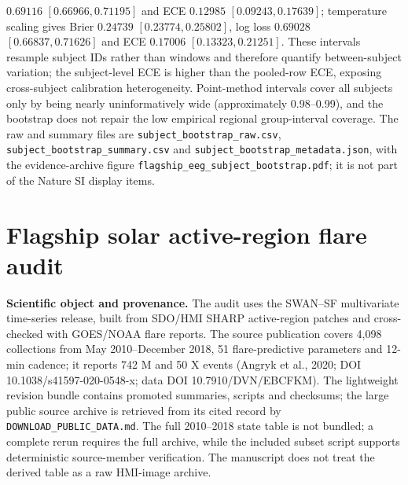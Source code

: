 \documentclass[11pt,a4paper]{article}
\numberwithin{equation}{section}
\theoremstyle{definition}\newtheorem{definition}[theorem]{Definition}
\theoremstyle{remark}\newtheorem{remark}[theorem]{Remark}
\begin{document}
$0.69116$ $[0.66966,0.71195]$ and ECE $0.12985$ $[0.09243,0.17639]$; temperature scaling gives Brier $0.24739$ $[0.23774,0.25802]$, log loss $0.69028$ $[0.66837,0.71626]$ and ECE $0.17006$ $[0.13323,0.21251]$. These intervals resample subject IDs rather than windows and therefore quantify between-subject variation; the subject-level ECE is higher than the pooled-row ECE, exposing cross-subject calibration heterogeneity. Point-method intervals cover all subjects only by being nearly uninformatively wide (approximately 0.98--0.99), and the bootstrap does not repair the low empirical regional group-interval coverage. The raw and summary files are \texttt{subject\_bootstrap\_raw.csv}, \texttt{subject\_bootstrap\_summary.csv} and \texttt{subject\_bootstrap\_metadata.json}, with the evidence-archive figure \texttt{flagship\_eeg\_subject\_bootstrap.pdf}; it is not part of the Nature SI display items.

\section{Flagship solar active-region flare audit}\label{sec:solar}
\textbf{Scientific object and provenance.} The audit uses the SWAN--SF multivariate time-series release, built from SDO/HMI SHARP active-region patches and cross-checked with GOES/NOAA flare reports. The source publication covers 4,098 collections from May 2010--December 2018, 51 flare-predictive parameters and 12-min cadence; it reports 742 M and 50 X events (Angryk et al., 2020; DOI 10.1038/s41597-020-0548-x; data DOI 10.7910/DVN/EBCFKM). The lightweight revision bundle contains promoted summaries, scripts and checksums; the large public source archive is retrieved from its cited record by \texttt{DOWNLOAD\_PUBLIC\_DATA.md}. The full 2010--2018 state table is not bundled; a complete rerun requires the full archive, while the included subset script supports deterministic source-member verification. The manuscript does not treat the derived table as a raw HMI-image archive.
\end{document}
